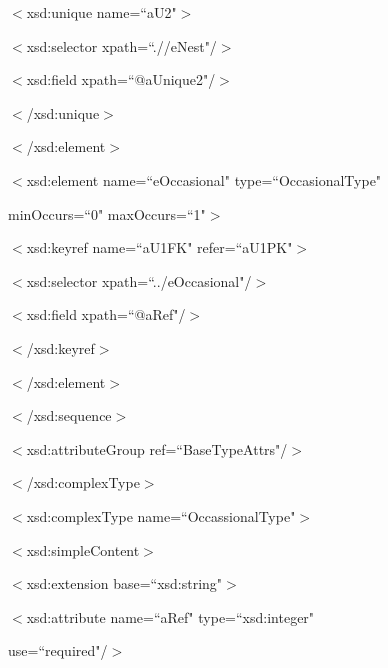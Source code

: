 \documentclass{article}%
\begin{document}
{{\begin{minipage}{3in}
\begin{tabbing}
\par
\>  \>  \>  $<$xsd:unique name=``aU2"$>$\  \\
\par
\>  \>  \>  \>  $<$xsd:selector xpath=``.//eNest"/$>$\  \\
\par
\>  \>  \>  \>  $<$xsd:field xpath=``@aUnique2"/$>$\  \\
\par
\>  \>  \>  $<$/xsd:unique$>$\  \\
\par
\>  \>  $<$/xsd:element$>$\  \\
\par
\>  \>  $<$xsd:element name=``eOccasional" type=``OccasionalType" \\
\par
\>  \>  minOccurs=``0" maxOccurs=``1"$>$\  \\
\par
\>  \>  \>   $<$xsd:keyref name=``aU1FK" refer=``aU1PK"$>$\  \\
\par
\>  \>  \>   \>   $<$xsd:selector xpath=``../eOccasional"/$>$\  \\
\par
\>  \>  \>   \>   $<$xsd:field xpath=``@aRef"/$>$\  \\
\par
\>  \>  \>   $<$/xsd:keyref$>$\  \\
\par
\>  \>  $<$/xsd:element$>$\  \\
\par
\>  $<$/xsd:sequence$>$\  \\
\par
\>  $<$xsd:attributeGroup ref=``BaseTypeAttrs"/$>$\  \\
\par
\>  $<$/xsd:complexType$>$\  \\
\par
\>  $<$xsd:complexType name=``OccassionalType"$>$\  \\
\par
\>  \>   $<$xsd:simpleContent$>$\  \\
\par
\>  \>  \>   $<$xsd:extension base=``xsd:string"$>$\  \\
\par
\>  \>  \>   \> $<$xsd:attribute name=``aRef" type=``xsd:integer" \\
\par
\>  \>  \>   \> use=``required"/$>$\  \\

\end{tabbing}
\end{minipage}}}
\end{document}
